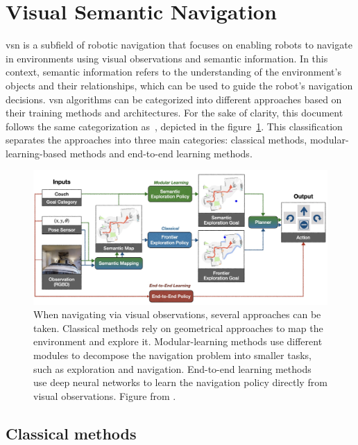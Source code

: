 \section{Visual Semantic Navigation}\label{sec:visual-semantic-navigation}

\acrfull{vsn} is a subfield of robotic navigation that focuses on enabling robots to navigate in environments using visual observations and semantic information.
In this context, semantic information refers to the understanding of the environment's objects and their relationships, which can be used to guide the robot's navigation decisions.
\acrshort{vsn} algorithms can be categorized into different approaches based on their training methods and architectures.
For the sake of clarity, this document follows the same categorization as~\cite{gervet2022}, depicted in the figure~\ref{fig:vsn-categories}.
This classification separates the approaches into three main categories: classical methods, modular-learning-based methods and end-to-end learning methods.

\begin{figure}
    \centering
    \includegraphics[width=\textwidth]{figures/related_work/methods_overview}
    \caption[Methods for \acrlong{vsn}]{When navigating via visual observations, several approaches can be taken.
    Classical methods rely on geometrical approaches to map the environment and explore it.
    Modular-learning methods use different modules to decompose the navigation problem into smaller tasks, such as exploration and navigation.
    End-to-end learning methods use deep neural networks to learn the navigation policy directly from visual observations.
    Figure from \cite{gervet2022}.}
    \label{fig:vsn-categories}
\end{figure}

\subsection{Classical methods}\label{subsec:classical-methods}

